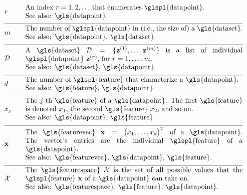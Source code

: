 \begin{align}
	&\sampleidx &\quad & \parbox{.90\textwidth}{An index $\sampleidx=1, 2, \ldots$ that 
		enumerates \glspl{datapoint}.
		\\ See also: \gls{datapoint}. }   \nonumber \\[2mm] \hline \nonumber\\[-5mm]
	&\samplesize &\quad &\parbox{.90\textwidth}{The number of \glspl{datapoint} in (i.e., the size of) a \gls{dataset}.
		\\ See also: \gls{datapoint}, \gls{dataset}.} \nonumber \\[2mm] \hline \nonumber\\[-5mm] 
	&\dataset &\quad & \parbox{.90\textwidth}{A \gls{dataset} $\dataset = \{ \datapoint^{(1)}, \ldots, \datapoint^{(\samplesize)} \}$ 
		is a list of individual \glspl{datapoint} $\datapoint^{(\sampleidx)}$, for $\sampleidx=1, \ldots, \samplesize$.
		\\ See also: \gls{dataset}, \gls{datapoint}.}   \nonumber \\[2mm] \hline \nonumber\\[-5mm]
	&\featurelen &\quad &\parbox{.90\textwidth}{The number of \glspl{feature} that characterize a \gls{datapoint}.
		\\ See also: \gls{feature}, \gls{datapoint}.}\nonumber \\[2mm] \hline \nonumber\\[-5mm]
	&\feature_{\featureidx} &\quad &\parbox{.90\textwidth}{The $\featureidx$-th \gls{feature} of a \gls{datapoint}. The first \gls{feature} 
		is denoted $\feature_{1}$, the second \gls{feature} $\feature_{2}$, and so on.
		\\ See also: \gls{datapoint}, \gls{feature}. } \nonumber \\[2mm] \hline \nonumber\\[-5mm] 
	&\featurevec &\quad &\parbox{.90\textwidth}{The \gls{featurevec} $\featurevec=\big(\feature_{1}, \ldots, \feature_{\featuredim}\big)^{T}$ of a \gls{datapoint}. The vector's entries 
		are the individual \glspl{feature} of a \gls{datapoint}.
		\\ See also: \gls{featurevec}, \gls{datapoint}, \gls{feature}. }\nonumber \\[2mm] \hline \nonumber\\[-5mm]
	&\featurespace &\quad & \parbox{.90\textwidth}{The \gls{featurespace} $\featurespace$ is 
		the set of all possible values that the \glspl{feature} $\featurevec$ of a \gls{datapoint} can take on.
		\\ See also: \gls{featurespace}, \gls{feature}, \gls{datapoint}.} \nonumber 
\end{align}        


